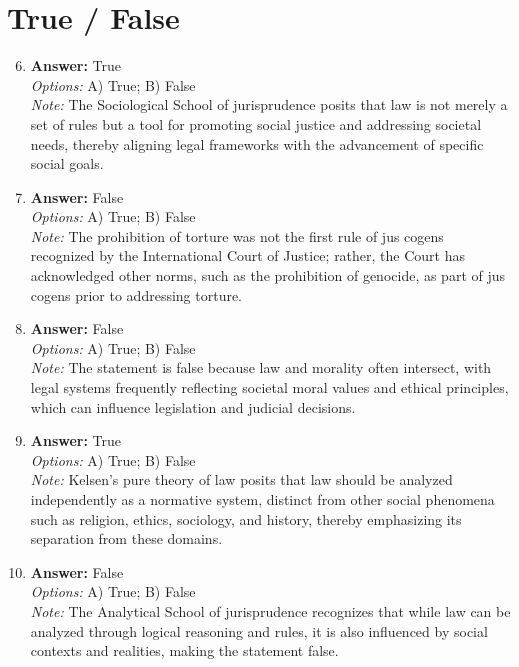 \documentclass[12pt]{article}
\begin{document}
\section*{True / False}
\begin{enumerate}[label=\arabic*.]
\setcounter{enumi}{5}
\item \textbf{Answer:} True
\\ \textit{Options:} A) True; B) False
\\ \textit{Note:} The Sociological School of jurisprudence posits that law is not merely a set of rules but a tool for promoting social justice and addressing societal needs, thereby aligning legal frameworks with the advancement of specific social goals.
\item \textbf{Answer:} False
\\ \textit{Options:} A) True; B) False
\\ \textit{Note:} The prohibition of torture was not the first rule of jus cogens recognized by the International Court of Justice; rather, the Court has acknowledged other norms, such as the prohibition of genocide, as part of jus cogens prior to addressing torture.
\item \textbf{Answer:} False
\\ \textit{Options:} A) True; B) False
\\ \textit{Note:} The statement is false because law and morality often intersect, with legal systems frequently reflecting societal moral values and ethical principles, which can influence legislation and judicial decisions.
\item \textbf{Answer:} True
\\ \textit{Options:} A) True; B) False
\\ \textit{Note:} Kelsen's pure theory of law posits that law should be analyzed independently as a normative system, distinct from other social phenomena such as religion, ethics, sociology, and history, thereby emphasizing its separation from these domains.
\item \textbf{Answer:} False
\\ \textit{Options:} A) True; B) False
\\ \textit{Note:} The Analytical School of jurisprudence recognizes that while law can be analyzed through logical reasoning and rules, it is also influenced by social contexts and realities, making the statement false.
\end{enumerate}
\end{document}
